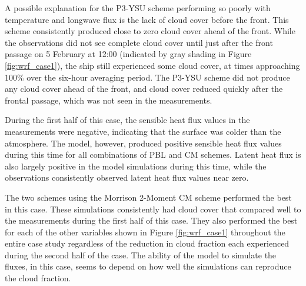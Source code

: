 A possible explanation for the P3-YSU scheme performing so poorly with temperature and longwave flux is the lack of cloud cover before the front. This scheme consistently produced close to zero cloud cover ahead of the front. While the observations did not see complete cloud cover until just after the front passage on 5 February at 12:00 (indicated by gray shading in Figure \ref{fig:wrf_case1}), the ship still experienced some cloud cover, at times approaching 100$\%$ over the six-hour averaging period. The P3-YSU scheme did not produce any cloud cover ahead of the front, and cloud cover reduced quickly after the frontal passage, which was not seen in the measurements. 

During the first half of this case, the sensible heat flux values in the measurements were negative, indicating that the surface was colder than the atmosphere. The model, however, produced positive sensible heat flux values during this time for all combinations of PBL and CM schemes. Latent heat flux is also largely positive in the model simulations during this time, while the observations consistently observed latent heat flux values near zero. 

The two schemes using the Morrison 2-Moment CM scheme performed the best in this case. These simulations consistently had cloud cover that compared well to the measurements during the first half of this case. They also performed the best for each of the other variables shown in Figure \ref{fig:wrf_case1} throughout the entire case study regardless of the reduction in cloud fraction each experienced during the second half of the case. The ability of the model to simulate the fluxes, in this case, seems to depend on how well the simulations can reproduce the cloud fraction.

